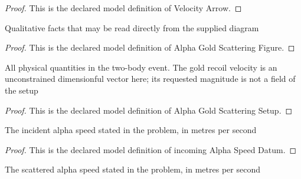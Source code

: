 \begin{proof}
  This is the declared model definition of Velocity Arrow.
\end{proof}
\begin{definition}
  \label{def:physics:phyx-mini-0497:phyxminiproblems-problemphyxmini0497-alphagoldscatteringfigure}
  Qualitative facts that may be read directly from the supplied diagram
\end{definition}
\begin{proof}
  This is the declared model definition of Alpha Gold Scattering Figure.
\end{proof}
\begin{definition}
  \label{def:physics:phyx-mini-0497:phyxminiproblems-problemphyxmini0497-alphagoldscatteringsetup}
  All physical quantities in the two-body event. The gold recoil velocity is an unconstrained dimensionful vector here; its requested magnitude is not a field of the setup
\end{definition}
\begin{proof}
  This is the declared model definition of Alpha Gold Scattering Setup.
\end{proof}
\begin{definition}
  \label{def:physics:phyx-mini-0497:phyxminiproblems-problemphyxmini0497-incomingalphaspeeddatum}
  The incident alpha speed stated in the problem, in metres per second
\end{definition}
\begin{proof}
  This is the declared model definition of incoming Alpha Speed Datum.
\end{proof}
\begin{definition}
  \label{def:physics:phyx-mini-0497:phyxminiproblems-problemphyxmini0497-scatteredalphaspeeddatum}
  The scattered alpha speed stated in the problem, in metres per second
\end{definition}

